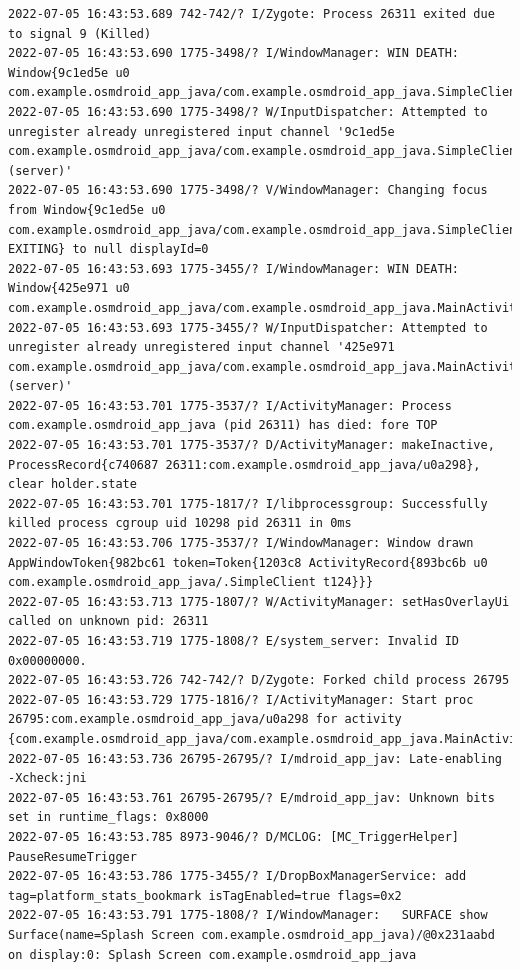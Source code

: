 \documentclass[a4paper,12pt]{book}
\begin{document}
\begin{lstlisting}
2022-07-05 16:43:53.689 742-742/? I/Zygote: Process 26311 exited due to signal 9 (Killed)
2022-07-05 16:43:53.690 1775-3498/? I/WindowManager: WIN DEATH: Window{9c1ed5e u0 com.example.osmdroid_app_java/com.example.osmdroid_app_java.SimpleClient}
2022-07-05 16:43:53.690 1775-3498/? W/InputDispatcher: Attempted to unregister already unregistered input channel '9c1ed5e com.example.osmdroid_app_java/com.example.osmdroid_app_java.SimpleClient (server)'
2022-07-05 16:43:53.690 1775-3498/? V/WindowManager: Changing focus from Window{9c1ed5e u0 com.example.osmdroid_app_java/com.example.osmdroid_app_java.SimpleClient EXITING} to null displayId=0
2022-07-05 16:43:53.693 1775-3455/? I/WindowManager: WIN DEATH: Window{425e971 u0 com.example.osmdroid_app_java/com.example.osmdroid_app_java.MainActivity}
2022-07-05 16:43:53.693 1775-3455/? W/InputDispatcher: Attempted to unregister already unregistered input channel '425e971 com.example.osmdroid_app_java/com.example.osmdroid_app_java.MainActivity (server)'
2022-07-05 16:43:53.701 1775-3537/? I/ActivityManager: Process com.example.osmdroid_app_java (pid 26311) has died: fore TOP 
2022-07-05 16:43:53.701 1775-3537/? D/ActivityManager: makeInactive, ProcessRecord{c740687 26311:com.example.osmdroid_app_java/u0a298}, clear holder.state
2022-07-05 16:43:53.701 1775-1817/? I/libprocessgroup: Successfully killed process cgroup uid 10298 pid 26311 in 0ms
2022-07-05 16:43:53.706 1775-3537/? I/WindowManager: Window drawn AppWindowToken{982bc61 token=Token{1203c8 ActivityRecord{893bc6b u0 com.example.osmdroid_app_java/.SimpleClient t124}}}
2022-07-05 16:43:53.713 1775-1807/? W/ActivityManager: setHasOverlayUi called on unknown pid: 26311
2022-07-05 16:43:53.719 1775-1808/? E/system_server: Invalid ID 0x00000000.
2022-07-05 16:43:53.726 742-742/? D/Zygote: Forked child process 26795
2022-07-05 16:43:53.729 1775-1816/? I/ActivityManager: Start proc 26795:com.example.osmdroid_app_java/u0a298 for activity {com.example.osmdroid_app_java/com.example.osmdroid_app_java.MainActivity}
2022-07-05 16:43:53.736 26795-26795/? I/mdroid_app_jav: Late-enabling -Xcheck:jni
2022-07-05 16:43:53.761 26795-26795/? E/mdroid_app_jav: Unknown bits set in runtime_flags: 0x8000
2022-07-05 16:43:53.785 8973-9046/? D/MCLOG: [MC_TriggerHelper] PauseResumeTrigger
2022-07-05 16:43:53.786 1775-3455/? I/DropBoxManagerService: add tag=platform_stats_bookmark isTagEnabled=true flags=0x2
2022-07-05 16:43:53.791 1775-1808/? I/WindowManager:   SURFACE show Surface(name=Splash Screen com.example.osmdroid_app_java)/@0x231aabd on display:0: Splash Screen com.example.osmdroid_app_java

\end{lstlisting}
\end{document}

